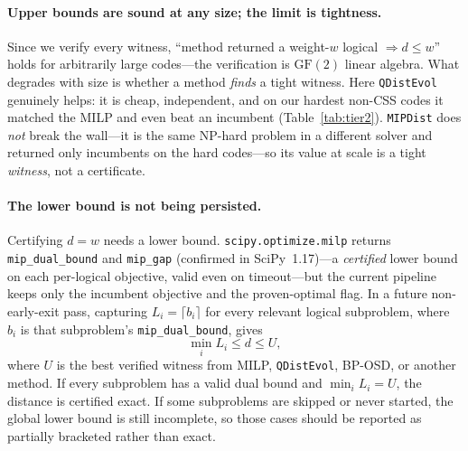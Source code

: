 \documentclass[11pt]{article}
\newcommand{\dleq}{d\!\le}
\newcommand{\tablecmd}[1]{\texttt{#1}}
\begin{document}
\paragraph{Upper bounds are sound at any size; the limit is tightness.} Since we
verify every witness, ``method returned a weight-$w$ logical $\Rightarrow \dleq w$''
holds for arbitrarily large codes---the verification is $\mathrm{GF}(2)$ linear
algebra. What degrades with size is whether a method \emph{finds} a tight witness.
Here \texttt{QDistEvol} genuinely helps: it is cheap, independent, and on our
hardest non-CSS codes it matched the MILP and even beat an incumbent
(Table~\ref{tab:tier2}). \texttt{MIPDist} does \emph{not} break the wall---it is
the same NP-hard problem in a different solver and returned only incumbents on the
hard codes---so its value at scale is a tight \emph{witness}, not a certificate.

\paragraph{The lower bound is not being persisted.} Certifying $d=w$ needs a lower
bound. \texttt{scipy.optimize.milp} returns \tablecmd{mip\_dual\_bound} and
\tablecmd{mip\_gap} (confirmed in SciPy~1.17)---a \emph{certified} lower bound on
each per-logical objective, valid even on timeout---but the current pipeline keeps
only the incumbent objective and the proven-optimal flag. In a future
non-early-exit pass, capturing $L_i=\lceil b_i\rceil$ for every relevant logical
subproblem, where $b_i$ is that subproblem's \tablecmd{mip\_dual\_bound}, gives
\[
  \min_i L_i \le d \le U,
\]
where $U$ is the best verified witness from MILP, \texttt{QDistEvol}, BP-OSD, or
another method. If every subproblem has a valid dual bound and $\min_i L_i=U$, the
distance is certified exact. If some subproblems are skipped or never started, the
global lower bound is still incomplete, so those cases should be reported as
partially bracketed rather than exact.
\end{document}
